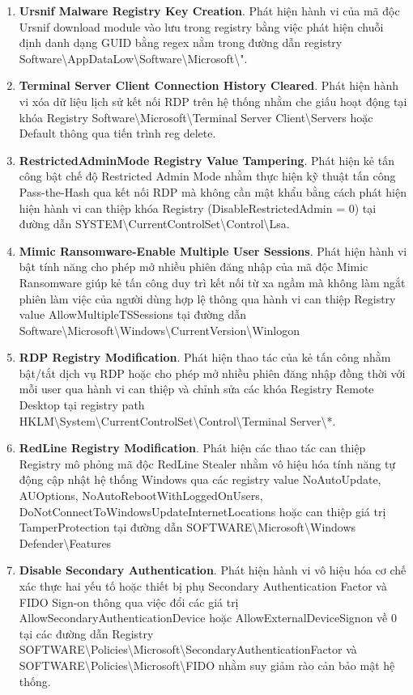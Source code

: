 \begin{enumerate}
\item \textbf{Ursnif Malware Registry Key Creation}. Phát hiện hành vi của mã độc Ursnif download module vào lưu trong registry bằng việc phát hiện chuỗi định danh dạng GUID bằng regex nằm trong đường dẫn registry Software\textbackslash{}AppDataLow\textbackslash{}Software\textbackslash{}Microsoft\textbackslash{}".
\item \textbf{Terminal Server Client Connection History Cleared}. Phát hiện hành vi xóa dữ liệu lịch sử kết nối RDP trên hệ thống nhằm che giấu hoạt động tại khóa Registry Software\textbackslash{}Microsoft\textbackslash{}Terminal Server Client\textbackslash{}Servers hoặc Default thông qua tiến trình reg delete.
\item \textbf{RestrictedAdminMode Registry Value Tampering}. Phát hiện kẻ tấn công bật chế độ Restricted Admin Mode nhằm thực hiện kỹ thuật tấn công Pass-the-Hash qua kết nối RDP mà không cần mật khẩu bằng cách phát hiện hiện hành vi can thiệp khóa Registry (DisableRestrictedAdmin = 0) tại đường dẫn SYSTEM\textbackslash{}CurrentControlSet\textbackslash{}Control\textbackslash{}Lsa.
\item \textbf{Mimic Ransomware-Enable Multiple User Sessions}. Phát hiện hành vi bật tính năng cho phép mở nhiều phiên đăng nhập của mã độc Mimic Ransomware giúp kẻ tấn công duy trì kết nối từ xa ngầm mà không làm ngắt phiên làm việc của người dùng hợp lệ thông qua hành vi can thiệp Registry value AllowMultipleTSSessions tại đường dẫn Software\textbackslash{}Microsoft\textbackslash{}Windows\textbackslash{}CurrentVersion\textbackslash{}Winlogon
\item \textbf{RDP Registry Modification}. Phát hiện thao tác của kẻ tấn công nhằm bật/tắt dịch vụ RDP hoặc cho phép mở nhiều phiên đăng nhập đồng thời với mỗi user qua hành vi can thiệp và chỉnh sửa các khóa Registry Remote Desktop tại registry path HKLM\textbackslash{}System\textbackslash{}CurrentControlSet\textbackslash{}Control\textbackslash{}Terminal Server\textbackslash{}*.
\item \textbf{RedLine Registry Modification}. Phát hiện các thao tác can thiệp Registry mô phỏng mã độc RedLine Stealer nhằm vô hiệu hóa tính năng tự động cập nhật hệ thống Windows qua các registry value NoAutoUpdate, AUOptions, NoAutoRebootWithLoggedOnUsers, DoNotConnectToWindowsUpdateInternetLocations hoặc can thiệp giá trị TamperProtection tại đường dẫn SOFTWARE\textbackslash{}Microsoft\textbackslash{}Windows Defender\textbackslash{}Features
\item \textbf{Disable Secondary Authentication}. Phát hiện hành vi vô hiệu hóa cơ chế xác thực hai yếu tố hoặc thiết bị phụ Secondary Authentication Factor và FIDO Sign-on thông qua việc đổi các giá trị AllowSecondaryAuthenticationDevice hoặc AllowExternalDeviceSignon về 0 tại các đường dẫn Registry SOFTWARE\textbackslash{}Policies\textbackslash{}Microsoft\textbackslash{}SecondaryAuthenticationFactor và SOFTWARE\textbackslash{}Policies\textbackslash{}Microsoft\textbackslash{}FIDO nhằm suy giảm rào cản bảo mật hệ thống.

\end{enumerate}
